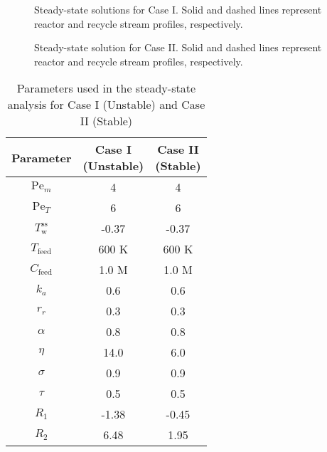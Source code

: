 \begin{figure}[!htbp]
    \centering
    
    \caption{Steady-state solutions for Case I. Solid and dashed lines represent reactor and recycle stream profiles, respectively.}
    \label{fig:3_ss_profiles}
\end{figure}

\begin{figure}[!htbp]
    \centering
    
    \caption{Steady-state solution for Case II. Solid and dashed lines represent reactor and recycle stream profiles, respectively.}
    \label{fig:3_ss_profiles_stable}
\end{figure}

\begin{table}[htbp]
\centering
\renewcommand{\arraystretch}{1.3}
\caption{Parameters used in the steady-state analysis for Case I (Unstable) and Case II (Stable)} \label{tab:3_pars}
\begin{tabular}{|c|c|c|}
\hline
\textbf{Parameter} & \makecell{\textbf{Case I} \\ \textbf{(Unstable)}} & \makecell{\textbf{Case II} \\ \textbf{(Stable)}} \\
\hline
$\mathrm{Pe}_m$  & 4        & 4      \\
$\mathrm{Pe}_T$  & 6        & 6      \\
$T_{\mathrm{w}}^{\mathrm{ss}}$ & -0.37 & -0.37  \\
$T_{\mathrm{feed}}$ & 600 K & 600 K  \\
$C_{\mathrm{feed}}$ & 1.0 M & 1.0 M  \\
$k_a$            & 0.6      & 0.6    \\
$r_r$            & 0.3      & 0.3    \\
$\alpha$         & 0.8      & 0.8    \\
$\eta$           & 14.0     & 6.0    \\
$\sigma$         & 0.9      & 0.9    \\
$\tau$           & 0.5      & 0.5    \\
$R_1$            & -1.38    & -0.45  \\
$R_2$            & 6.48     & 1.95   \\
\hline
\end{tabular}
\end{table}


